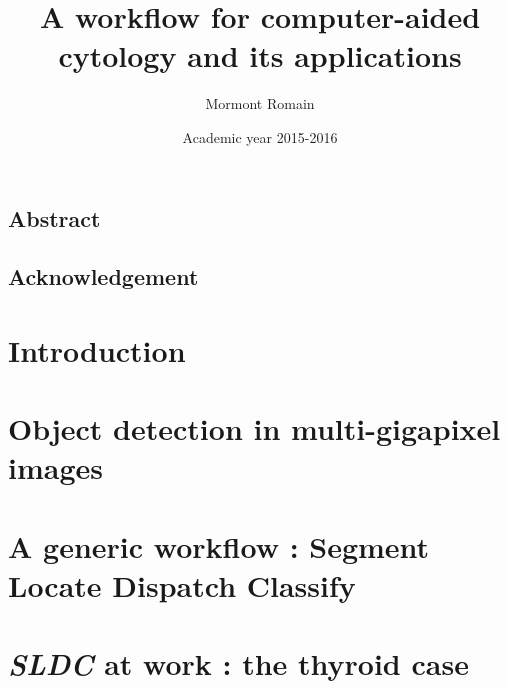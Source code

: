 \documentclass[a4paper,12pt]{report}
\author{Mormont Romain}
\title{A workflow for computer-aided cytology and its applications}
\date{Academic year 2015-2016}
\begin{document}
	
	
	
	\newpage 
	\clearpage
	
	\section*{Abstract}
	
	\newpage
		
	\section*{Acknowledgement}
	
	\newpage
	
	\tableofcontents
	
	\newpage
	\clearpage
	
	\chapter{Introduction}
	
	\newpage
	
	\chapter{Object detection in multi-gigapixel images}
	
	\newpage
	
	\chapter{A generic workflow : Segment Locate Dispatch Classify}
	
	\newpage
	
	\chapter{\textit{SLDC} at work : the thyroid case}
	
	\newpage
	
\end{document}
